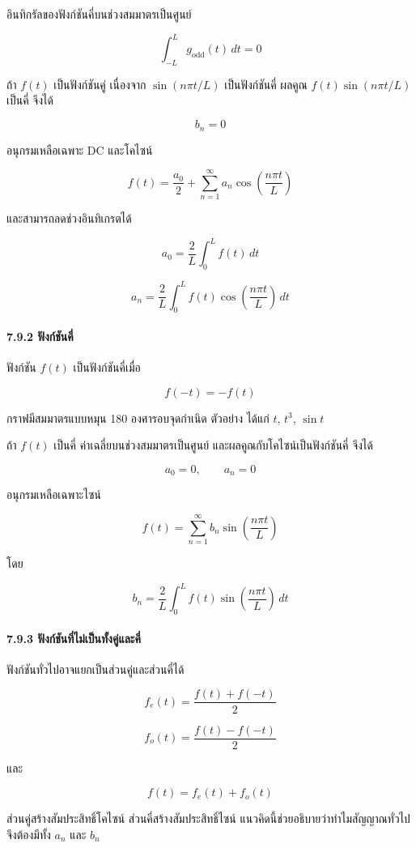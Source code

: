 อินทิกรัลของฟังก์ชันคี่บนช่วงสมมาตรเป็นศูนย์

\[
\int_{-L}^{L}g_{\text{odd}}(t)\,dt=0
\]

ถ้า \(f(t)\) เป็นฟังก์ชันคู่ เนื่องจาก \(\sin(n\pi t/L)\) เป็นฟังก์ชันคี่ ผลคูณ \(f(t)\sin(n\pi t/L)\) เป็นคี่ จึงได้

\[
b_n=0
\]

อนุกรมเหลือเฉพาะ DC และโคไซน์

\[
f(t)=\frac{a_0}{2}+\sum_{n=1}^{\infty}a_n\cos\left(\frac{n\pi t}{L}\right)
\]

และสามารถลดช่วงอินทิเกรตได้

\[
a_0=\frac{2}{L}\int_0^L f(t)\,dt
\]

\[
a_n=\frac{2}{L}\int_0^L f(t)\cos\left(\frac{n\pi t}{L}\right)\,dt
\]

\paragraph{7.9.2 ฟังก์ชันคี่}

ฟังก์ชัน \(f(t)\) เป็นฟังก์ชันคี่เมื่อ

\[
f(-t)=-f(t)
\]

กราฟมีสมมาตรแบบหมุน 180 องศารอบจุดกำเนิด ตัวอย่าง ได้แก่ \(t\), \(t^3\), \(\sin t\)

ถ้า \(f(t)\) เป็นคี่ ค่าเฉลี่ยบนช่วงสมมาตรเป็นศูนย์ และผลคูณกับโคไซน์เป็นฟังก์ชันคี่ จึงได้

\[
a_0=0,\qquad a_n=0
\]

อนุกรมเหลือเฉพาะไซน์

\[
f(t)=\sum_{n=1}^{\infty}b_n\sin\left(\frac{n\pi t}{L}\right)
\]

โดย

\[
b_n=\frac{2}{L}\int_0^L f(t)\sin\left(\frac{n\pi t}{L}\right)\,dt
\]

\paragraph{7.9.3 ฟังก์ชันที่ไม่เป็นทั้งคู่และคี่}

ฟังก์ชันทั่วไปอาจแยกเป็นส่วนคู่และส่วนคี่ได้

\[
f_e(t)=\frac{f(t)+f(-t)}{2}
\]

\[
f_o(t)=\frac{f(t)-f(-t)}{2}
\]

และ

\[
f(t)=f_e(t)+f_o(t)
\]

ส่วนคู่สร้างสัมประสิทธิ์โคไซน์ ส่วนคี่สร้างสัมประสิทธิ์ไซน์ แนวคิดนี้ช่วยอธิบายว่าทำไมสัญญาณทั่วไปจึงต้องมีทั้ง \(a_n\) และ \(b_n\)

